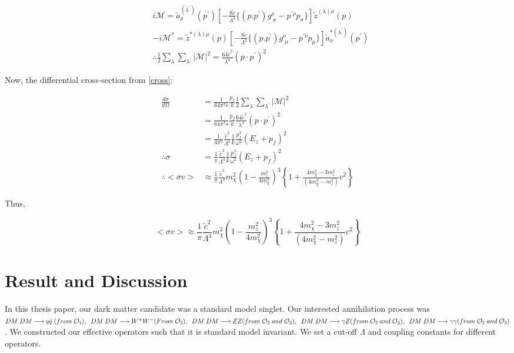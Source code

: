 \documentclass[12pt]{report}
\begin{document}
\begin{align*}
&i \mathcal{M} = \tilde{a}^{(\lambda^\prime)}_\rho(p^\prime) \left[-\frac{8\tilde{c}}{\Lambda^2} \{ (p.p^\prime) g^\rho_{\; \sigma} - p^{\prime \rho} p_\sigma \} \right] \tilde{z}^{(\lambda) \sigma}(p)\\
&-i \mathcal{M}^* = \tilde{z}^{*(\lambda) \mu}(p) \left[ -\frac{8\tilde{c}}{\Lambda^2} \{ (p.p^\prime) g^\nu_{\; \mu} - p^{\prime \nu} p_\mu \} \right] \tilde{a}^{*(\lambda^\prime)}_\nu(p^\prime)\\
& \therefore \frac{1}{2} \sum_\lambda \sum_{\lambda^\prime} |\mathcal{M}|^2 = \frac{64 \tilde{c}^2}{\lambda^4} (p \cdot p^\prime)^2
\end{align*}


Now, the differential cross-section from \ref{cross}:

\begin{align*}
\frac{d\sigma}{d\Omega} &= \frac{1}{64 \pi^2 s} \frac{p_f}{k} \frac{1}{2} \sum_\lambda \sum_{\lambda^\prime} |\mathcal{M}|^2\\
&= \frac{1}{64 \pi^2 s} \frac{p_f}{k} \frac{64 \tilde{c}^2}{\lambda^4} (p \cdot p^\prime)^2\\
&= \frac{1}{4 \pi^2} \frac{\tilde{c}^2}{\Lambda^4} \frac{1}{k} \frac{p^3_f}{\omega^2}(E_z + p_f)^2 \\
\therefore \sigma &= \frac{1}{\pi} \frac{\tilde{c}^2}{\Lambda^4} \frac{1}{k} \frac{p^3_f}{\omega^2}(E_z + p_f)^2 \\
\therefore <\sigma v> &\approx \frac{1}{\pi} \frac{\tilde{c}^2}{\Lambda^4} m^2_\chi \left( 1- \frac{m^2_z}{4 m^2_\chi} \right)^3 \left\{1 + \frac{4m^2_\chi - 3m^2_z}{(4m^2_\chi - m^2_z)} v^2\right\}
\end{align*}


Thus,

\begin{equation}
 <\sigma v> \approx \frac{1}{\pi} \frac{\tilde{c}^2}{\Lambda^4} m^2_\chi \left( 1- \frac{m^2_z}{4 m^2_\chi} \right)^3 \left\{1 + \frac{4m^2_\chi - 3m^2_z}{(4m^2_\chi - m^2_z)} v^2\right\} \label{gzcross}
\end{equation}

\pagebreak

\chapter{Result and Discussion} 
 In this thesis paper, our dark matter candidate was a standard model singlet. Our interested annihilation process was $ DM\;DM \longrightarrow q \bar{q}\; (from\; \mathcal{O}_1),\\ \; \; DM\; DM \longrightarrow W^+W^-(From\; \mathcal{O}_2), \; \;
DM\; DM \longrightarrow ZZ (from\; \mathcal{O}_2 \; and\; \mathcal{O}_3 ),\\ \; \; DM\; DM \longrightarrow \gamma Z (from\; \mathcal{O}_2 \; and\; \mathcal{O}_3 ) , \; \; DM\; DM \longrightarrow \gamma  \gamma (from\; \mathcal{O}_2  \; and\; \mathcal{O}_3 )$.  We constructed our effective operators such that it is standard model invariant. We set a cut-off $\Lambda$ and coupling constants for different operators.
 
\end{document}
